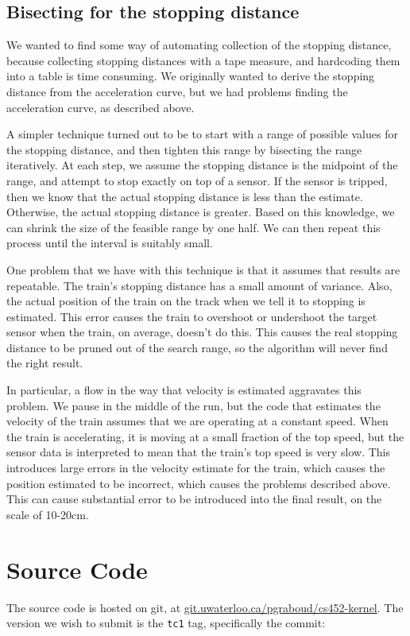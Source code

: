 \documentclass[titlepage]{article}
\begin{document}
\subsection{Bisecting for the stopping distance}
We wanted to find some way of automating collection of the stopping distance,
because collecting stopping distances with a tape measure, and hardcoding
them into a table is time consuming.
We originally wanted to derive the stopping distance from the acceleration curve,
but we had problems finding the acceleration curve, as described above.

A simpler technique turned out to be to start with a range of possible
values for the stopping distance, and then tighten this range by bisecting
the range iteratively.
At each step, we assume the stopping distance is the midpoint of
the range, and attempt to stop exactly on top of a sensor.
If the sensor is tripped, then we know that the actual stopping distance
is less than the estimate.
Otherwise, the actual stopping distance is greater.
Based on this knowledge, we can shrink the size of the feasible range by
one half.
We can then repeat this process until the interval is suitably small.

One problem that we have with this technique is that it assumes that results
are repeatable.
The train's stopping distance has a small amount of variance.
Also, the actual position of the train on the track when we tell it to stopping
is estimated.
This error causes the train to overshoot or undershoot the target sensor when
the train, on average, doesn't do this.
This causes the real stopping distance to be pruned out of the search range, so
the algorithm will never find the right result.

In particular, a flow in the way that velocity is estimated aggravates this problem.
We pause in the middle of the run, but the code that estimates the velocity
of the train assumes that we are operating at a constant speed.
When the train is accelerating, it is moving at a small fraction of the top speed,
but the sensor data is interpreted to mean that the train's top speed is
very slow.
This introduces large errors in the velocity estimate for the train, which
causes the position estimated to be incorrect, which causes the problems described
above.
This can cause substantial error to be introduced into the final result, on
the scale of 10-20cm.

\section{Source Code}
The source code is hosted on git, at \url{git.uwaterloo.ca/pgraboud/cs452-kernel}.
The version we wish to submit is the \texttt{tc1} tag, specifically
the commit:

\end{document}
